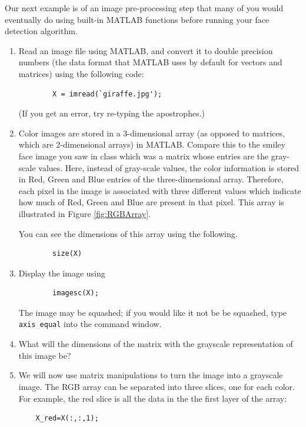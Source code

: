 \begin{prob}
    Our next example is of an image pre-processing step that many of you would eventually do using built-in MATLAB functions before running your face detection algorithm.
        \begin{enumerate}
        \item Read an image file using MATLAB, and convert it to double precision numbers (the data format that MATLAB uses by default for vectors and matrices) using the following code:
        \begin{verbatim}
        X = imread(`giraffe.jpg');
        \end{verbatim}
        (If you get an error, try re-typing the apostrophes.)

        \item Color images are stored in a 3-dimensional array (as opposed to matrices, which are 2-dimensional arrays) in MATLAB. Compare this to the smiley face image you saw in class which was a matrix whose entries are the gray-scale values. Here, instead of gray-scale values, the color information is stored in Red, Green and Blue entries of the three-dimensional array. Therefore, each pixel in the image is associated with three different values which indicate how much of Red, Green and Blue are present in that pixel.  This array is illustrated in Figure \ref{fig:RGBArray}.

         You can see the dimensions of this array using the following.
        \begin{verbatim}
        size(X)
        \end{verbatim}

        \item Display the image using

        \begin{verbatim}
        imagesc(X);
        \end{verbatim}

    The image may be squashed; if you would like it not be be squashed, type \texttt{axis equal} into the command window.

    \item What will the dimensions of the matrix with the grayscale representation of this image be? 
    
    \item We will now use matrix manipulations to turn the image into a grayscale image. The RGB array can be separated into three slices, one for each color. For example, the red slice is all the data in the the first layer of the array:
    \begin{verbatim}
    X_red=X(:,:,1);
    \end{verbatim}


\end{enumerate}
\end{prob}
